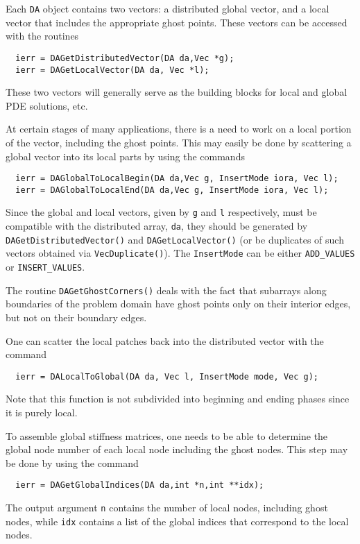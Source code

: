 Each {\tt DA} object contains two vectors: a distributed global vector, 
and a local vector that includes the appropriate ghost points. These
vectors can be accessed 
with the routines 
\begin{verbatim}
  ierr = DAGetDistributedVector(DA da,Vec *g);
  ierr = DAGetLocalVector(DA da, Vec *l);
\end{verbatim}
These two vectors will generally serve as the building blocks for 
local and global PDE solutions, etc.

At certain stages of many applications, there is a need to work 
on a local portion of the vector, including the ghost points. 
This may easily be done by scattering a global vector into its 
local parts by using the 
commands 
\begin{verbatim}
  ierr = DAGlobalToLocalBegin(DA da,Vec g, InsertMode iora, Vec l);
  ierr = DAGlobalToLocalEnd(DA da,Vec g, InsertMode iora, Vec l);
\end{verbatim}
Since the global and local vectors, given by {\tt g} and {\tt l} respectively,
must be compatible with the distributed array, {\tt da}, they should be
generated by {\tt DAGetDistributedVector()} 
 and {\tt DAGetLocalVector()}
(or be duplicates of such vectors obtained via {\tt VecDuplicate()}).
The {\tt InsertMode} can be either {\tt ADD\_VALUES} or {\tt INSERT\_VALUES}.

The routine  {\tt DAGetGhostCorners()}
deals with the fact that subarrays along boundaries of the problem
domain have ghost points only on their interior edges, but not on
their boundary edges.

One can scatter the local patches back into the distributed vector
with the command 
\begin{verbatim}
  ierr = DALocalToGlobal(DA da, Vec l, InsertMode mode, Vec g);
\end{verbatim}
Note that this function is not
subdivided into beginning and ending phases since it is purely local.

To assemble global stiffness matrices, one needs to be 
able to determine the global node number of each local node 
including the ghost nodes. This step may be done by using the 
command 
\begin{verbatim}
  ierr = DAGetGlobalIndices(DA da,int *n,int **idx);
\end{verbatim}
The output argument {\tt n} contains the number of 
local nodes, including ghost nodes, while {\tt idx} contains
a list of the global indices that correspond to the local nodes.

